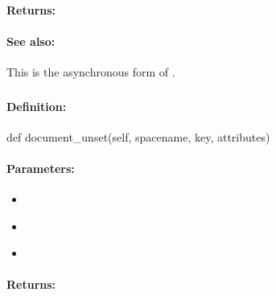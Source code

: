 \paragraph{Returns:}


\paragraph{See also:}  This is the asynchronous form of .

\pagebreak
\subsubsection{}
\label{api:python:document_unset}


\paragraph{Definition:}
\begin{pythoncode}
def document_unset(self, spacename, key, attributes)
\end{pythoncode}

\paragraph{Parameters:}
\begin{itemize}[noitemsep]
\item {}\\

\item {}\\

\item {}\\

\end{itemize}

\paragraph{Returns:}


\pagebreak
\subsubsection{}
\label{api:python:async_document_unset}


